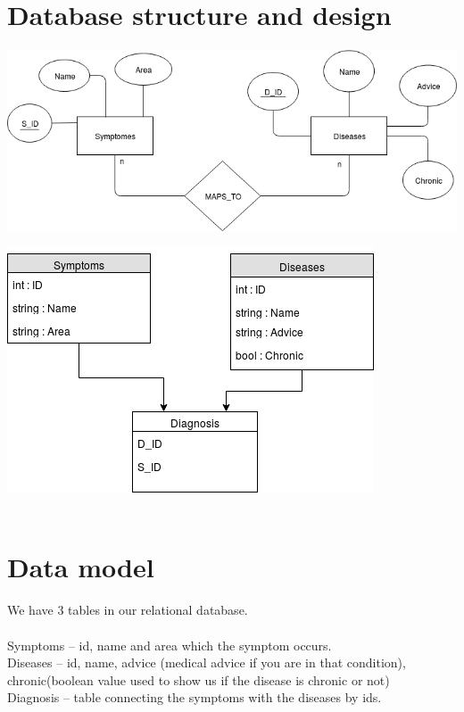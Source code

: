 \section{Database structure and design}
\paragraph{}

\includegraphics[height = 0.35\textheight, width = \textwidth]{DB}

\includegraphics[height = 0.35\textheight, width = \textwidth]{UML}
\\
\\
\section{Data model}
\paragraph{}
We have 3 tables in our relational database.\\
\\
Symptoms – id, name and area which the symptom occurs. \\
Diseases – id, name, advice (medical advice if you are in that condition), chronic(boolean value used to show us if the disease is chronic or not)\\
Diagnosis – table connecting the symptoms with the diseases by ids.\\

